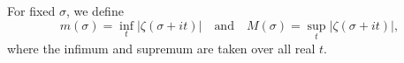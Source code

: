 For fixed $\sigma$, we define
$$m(\sigma) = \inf_t |\zeta(\sigma + it)| \quad \text{and} \quad M(\sigma) = \sup_t |\zeta(\sigma + it)|,$$
where the infimum and supremum are taken over all real $t$.
